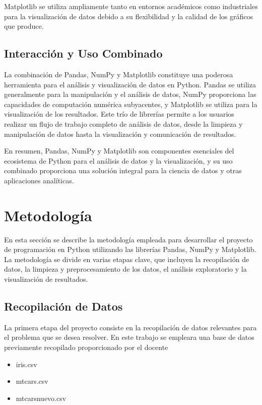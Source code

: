 \documentclass[conference]{IEEEtran}
\begin{document}
    Matplotlib se utiliza ampliamente tanto en entornos académicos como industriales para la visualización de datos debido a su flexibilidad y la calidad de los gráficos que produce.
    
    \subsection{Interacción y Uso Combinado}
    
    La combinación de Pandas, NumPy y Matplotlib constituye una poderosa herramienta para el análisis y visualización de datos en Python. Pandas se utiliza generalmente para la manipulación y el análisis de datos, NumPy proporciona las capacidades de computación numérica subyacentes, y Matplotlib se utiliza para la visualización de los resultados. Este trío de librerías permite a los usuarios realizar un flujo de trabajo completo de análisis de datos, desde la limpieza y manipulación de datos hasta la visualización y comunicación de resultados.
    
    En resumen, Pandas, NumPy y Matplotlib son componentes esenciales del ecosistema de Python para el análisis de datos y la visualización, y su uso combinado proporciona una solución integral para la ciencia de datos y otras aplicaciones analíticas.
	
\section{Metodolog\'ia}

    En esta sección se describe la metodología empleada para desarrollar el proyecto de programación en Python utilizando las librerías Pandas, NumPy y Matplotlib. La metodología se divide en varias etapas clave, que incluyen la recopilación de datos, la limpieza y preprocesamiento de los datos, el análisis exploratorio y la visualización de resultados.
    
    \subsection{Recopilación de Datos}
    La primera etapa del proyecto consiste en la recopilación de datos relevantes para el problema que se desea resolver. En este trabajo se empleara una base de datos previamente recopilado proporcionado por el docente
    
    \begin{itemize}
        \item iris.csv
        \item mtcars.csv
        \item mtcarsnuevo.csv
    \end{itemize}
    
\end{document}
